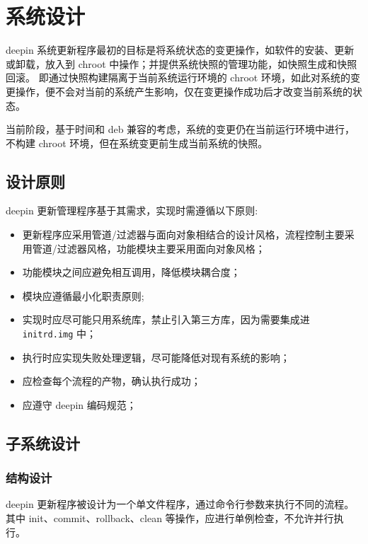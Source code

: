 \documentclass{utart}
\begin{document}
\section{系统设计}
deepin 系统更新程序最初的目标是将系统状态的变更操作，如软件的安装、更新或卸载，放入到 chroot 中操作；并提供系统快照的管理功能，如快照生成和快照回滚。
即通过快照构建隔离于当前系统运行环境的 chroot 环境，如此对系统的变更操作，便不会对当前的系统产生影响，仅在变更操作成功后才改变当前系统的状态。

当前阶段，基于时间和 deb 兼容的考虑，系统的变更仍在当前运行环境中进行，不构建 chroot 环境，但在系统变更前生成当前系统的快照。

\subsection{设计原则}
deepin 更新管理程序基于其需求，实现时需遵循以下原则: 
\begin{itemize}[leftmargin=4em]
\item 更新程序应采用管道/过滤器与面向对象相结合的设计风格，流程控制主要采用管道/过滤器风格，功能模块主要采用面向对象风格；
\item 功能模块之间应避免相互调用，降低模块耦合度；
\item 模块应遵循最小化职责原则;
\item 实现时应尽可能只用系统库，禁止引入第三方库，因为需要集成进 \texttt{initrd.img} 中；
\item 执行时应实现失败处理逻辑，尽可能降低对现有系统的影响；
\item 应检查每个流程的产物，确认执行成功；
\item 应遵守 deepin 编码规范；
\end{itemize}

\subsection{子系统设计}
\subsubsection{结构设计}
deepin 更新程序被设计为一个单文件程序，通过命令行参数来执行不同的流程。
其中 init、commit、rollback、clean 等操作，应进行单例检查，不允许并行执行。
\end{document}
